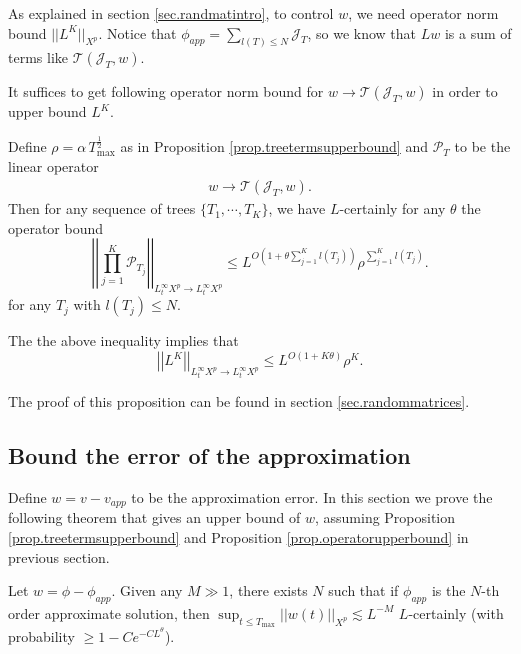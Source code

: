 As explained in section \ref{sec.randmatintro}, to control $w$, we need operator norm bound $||L^K||_{X^p}$. Notice that $\phi_{app}=\sum_{l(T)\le N} \mathcal{J}_T$, so we know that $Lw$ is a sum of terms like $\mathcal{T}(\mathcal{J}_{T},w)$.

It suffices to get following operator norm bound for $w\rightarrow \mathcal{T}(\mathcal{J}_{T},w)$ in order to upper bound $L^K$.

\begin{prop}\label{prop.operatorupperbound}
Define $\rho=\alpha\, T^{\frac{1}{2}}_{\text{max}}$ as in Proposition \ref{prop.treetermsupperbound} and $\mathcal{P}_{T}$ to be the linear operator
\begin{equation}
\begin{split}
    w\rightarrow \mathcal{T}(\mathcal{J}_{T},w).
\end{split}
\end{equation} 
Then for any sequence of trees $\{T_1,\cdots,T_K\}$, we have $L$-certainly for any $\theta$ the operator bound
\begin{equation}\label{eq.operatornorm'}
    \left|\left|\prod_{j=1}^K\mathcal{P}_{T_j}\right|\right|_{L_t^{\infty}X^p\rightarrow L_t^{\infty}X^p}\le L^{O\left(1+\theta\sum_{j=1}^K l(T_j)\right)} \rho^{\sum_{j=1}^K l(T_j)}.
\end{equation}
for any $T_j$ with $l(T_j)\le N$. 

The the above inequality implies that 
\begin{equation}\label{eq.operatornorm}
    \left|\left|L^K\right|\right|_{L_t^{\infty}X^p\rightarrow L_t^{\infty}X^p}\le L^{O(1+K\theta)} \rho^{K}.
\end{equation}
\end{prop}

The proof of this proposition can be found in section \ref{sec.randommatrices}.
\subsection{Bound the error of the approximation}\label{sec.errorw}

Define $w=v-v_{app}$ to be the approximation error. In this section we prove the following theorem that gives an upper bound of $w$, assuming Proposition \ref{prop.treetermsupperbound} and Proposition \ref{prop.operatorupperbound} in previous section.


\begin{thm}\label{th.app}
Let $w=\phi-\phi_{app}$. Given any $M\gg 1$, there exists $N$ such that if $\phi_{app}$ is the $N$-th order approximate solution, then $\sup_{t\le T_{\text{max}}}||w(t)||_{X^p}\lesssim L^{-M}$ $L$-certainly (with probability $\geq 1-Ce^{-CL^\theta}$).
\end{thm}

